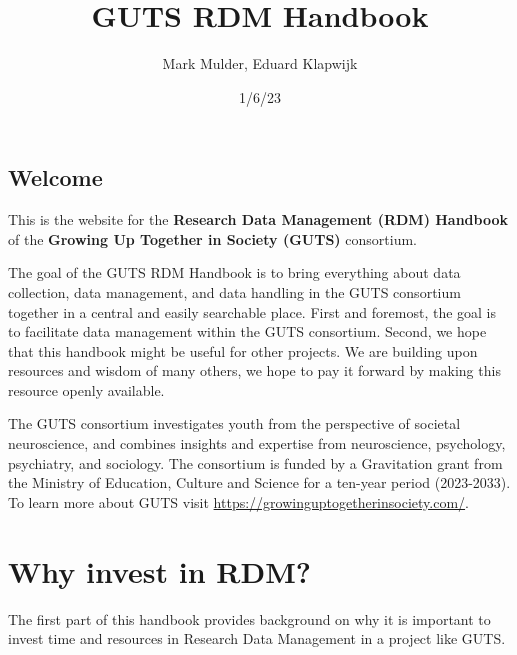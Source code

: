 \documentclass[
  letterpaper,
  DIV=11,
  numbers=noendperiod]{scrreprt}
\title{GUTS RDM Handbook}
\author{Mark Mulder, Eduard Klapwijk}
\date{1/6/23}
\renewcommand*\contentsname{Table of contents}
\newcommand\contentsname{Table of contents}
\begin{document}
\maketitle
\ifdefined\Shaded\renewenvironment{Shaded}{\begin{tcolorbox}[boxrule=0pt, borderline west={3pt}{0pt}{shadecolor}, breakable, enhanced, interior hidden, sharp corners, frame hidden]}{\end{tcolorbox}}\fi

\renewcommand*\contentsname{Table of contents}
{
\hypersetup{linkcolor=}
\setcounter{tocdepth}{2}
\tableofcontents
}

\hypertarget{welcome}{%
\chapter*{Welcome}\label{welcome}}


This is the website for the \textbf{Research Data Management (RDM)
Handbook} of the \textbf{Growing Up Together in Society (GUTS)}
consortium.

The goal of the GUTS RDM Handbook is to bring everything about data
collection, data management, and data handling in the GUTS consortium
together in a central and easily searchable place. First and foremost,
the goal is to facilitate data management within the GUTS consortium.
Second, we hope that this handbook might be useful for other projects.
We are building upon resources and wisdom of many others, we hope to pay
it forward by making this resource openly available.

The GUTS consortium investigates youth from the perspective of societal
neuroscience, and combines insights and expertise from neuroscience,
psychology, psychiatry, and sociology. The consortium is funded by a
Gravitation grant from the Ministry of Education, Culture and Science
for a ten-year period (2023-2033). To learn more about GUTS visit
\url{https://growinguptogetherinsociety.com/}.

\part{Why invest in RDM?}

The first part of this handbook provides background on why it is
important to invest time and resources in Research Data Management in a
project like GUTS.
\end{document}
